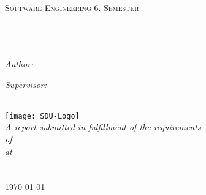 \documentclass[
11pt, %
oneside, %
english, %
singlespacing, %
headsepline, %
]{MastersDoctoralThesis} %
\author{Lasse Bjørn Hansen\\
	Simon Flensted} %
\begin{document}
\frontmatter %

\pagestyle{plain} %


\begin{titlepage}
\begin{center}

\textsc{\LARGE \univname}\\[1.5cm] %
\textsc{\Large Software Engineering 6. Semester}\\[0.5cm] %

\HRule \\[0.4cm] %
{\huge \bfseries \ttitle}\\[0.4cm] %
\HRule \\[1.5cm] %
 
\begin{minipage}{0.4\textwidth}
\begin{flushleft} \large
\emph{Author:}\\
\authorname %
\end{flushleft}
\end{minipage}
\begin{minipage}{0.4\textwidth}
\begin{flushright} \large
\emph{Supervisor:} \\
{\supname} %
\end{flushright}
\end{minipage}\\[3cm]
\texttt{[image: SDU-Logo]}\\ %
\large \textit{A report submitted in fulfillment of the requirements\\  of \degreename}\\[0.3cm] %
\textit{at}\\[0.4cm]
\univname\\\deptname\\[2cm] %
 
{\large \today}\\[4cm] %

 
\vfill
\end{center}
\end{titlepage}
\end{document}
